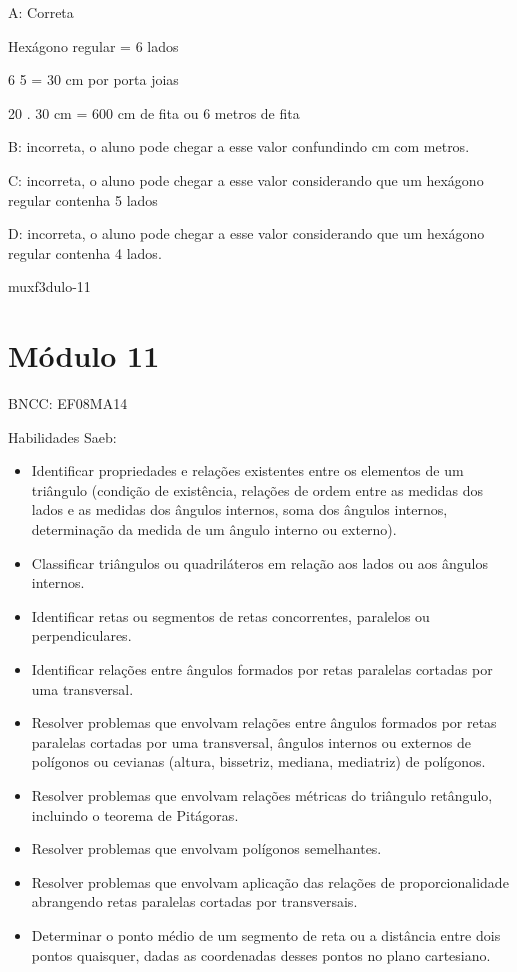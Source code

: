 {A: Correta

Hexágono regular = 6 lados

\num{6} 5 = 30 cm por porta joias

20 . 30 cm = 600 cm de fita ou 6 metros de fita

B: incorreta, o aluno pode chegar a esse valor confundindo cm com
metros.

C: incorreta, o aluno pode chegar a esse valor considerando que um
hexágono regular contenha 5 lados

D: incorreta, o aluno pode chegar a esse valor considerando que um
hexágono regular contenha 4 lados.

muxf3dulo-11}{%
\section{Módulo 11}

BNCC: EF08MA14

Habilidades Saeb:

\begin{itemize}
\item
  Identificar propriedades e relações existentes entre os elementos de
  um triângulo (condição de existência, relações de ordem entre as
  medidas dos lados e as medidas dos ângulos internos, soma dos ângulos
  internos, determinação da medida de um ângulo interno ou externo).
\item
  Classificar triângulos ou quadriláteros em relação aos lados ou aos
  ângulos internos.
\item
  Identificar retas ou segmentos de retas concorrentes, paralelos ou
  perpendiculares.
\item
  Identificar relações entre ângulos formados por retas paralelas
  cortadas por uma transversal.
\item
  Resolver problemas que envolvam relações entre ângulos formados por
  retas paralelas cortadas por uma transversal, ângulos internos ou
  externos de polígonos ou cevianas (altura, bissetriz, mediana,
  mediatriz) de polígonos.
\item
  Resolver problemas que envolvam relações métricas do triângulo
  retângulo, incluindo o teorema de Pitágoras.
\item
  Resolver problemas que envolvam polígonos semelhantes.
\item
  Resolver problemas que envolvam aplicação das relações de
  proporcionalidade abrangendo retas paralelas cortadas por
  transversais.
\item
  Determinar o ponto médio de um segmento de reta ou a distância entre
  dois pontos quaisquer, dadas as coordenadas desses pontos no plano
  cartesiano.
\end{itemize}

}
